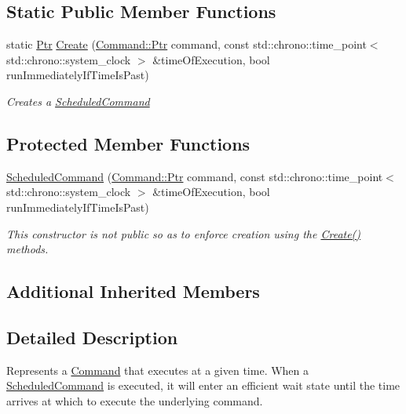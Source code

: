 \subsection*{Static Public Member Functions}
\begin{DoxyCompactItemize}
\item 
static \mbox{\hyperlink{class_command_lib_1_1_command_a3b3e4f00144373299df5c6bb1acc319d}{Ptr}} \mbox{\hyperlink{class_command_lib_1_1_scheduled_command_abf6008570965c8931d9c1bd8cd4f7b6a}{Create}} (\mbox{\hyperlink{class_command_lib_1_1_command_a3b3e4f00144373299df5c6bb1acc319d}{Command\+::\+Ptr}} command, const std\+::chrono\+::time\+\_\+point$<$ std\+::chrono\+::system\+\_\+clock $>$ \&time\+Of\+Execution, bool run\+Immediately\+If\+Time\+Is\+Past)
\begin{DoxyCompactList}\small\item\em Creates a \mbox{\hyperlink{class_command_lib_1_1_scheduled_command}{Scheduled\+Command}} \end{DoxyCompactList}\end{DoxyCompactItemize}
\subsection*{Protected Member Functions}
\begin{DoxyCompactItemize}
\item 
\mbox{\hyperlink{class_command_lib_1_1_scheduled_command_a4f22a429c29a9e28f547f1f9f2578f93}{Scheduled\+Command}} (\mbox{\hyperlink{class_command_lib_1_1_command_a3b3e4f00144373299df5c6bb1acc319d}{Command\+::\+Ptr}} command, const std\+::chrono\+::time\+\_\+point$<$ std\+::chrono\+::system\+\_\+clock $>$ \&time\+Of\+Execution, bool run\+Immediately\+If\+Time\+Is\+Past)
\begin{DoxyCompactList}\small\item\em This constructor is not public so as to enforce creation using the \mbox{\hyperlink{class_command_lib_1_1_scheduled_command_abf6008570965c8931d9c1bd8cd4f7b6a}{Create()}} methods. \end{DoxyCompactList}\end{DoxyCompactItemize}
\subsection*{Additional Inherited Members}


\subsection{Detailed Description}
Represents a \mbox{\hyperlink{class_command_lib_1_1_command}{Command}} that executes at a given time. When a \mbox{\hyperlink{class_command_lib_1_1_scheduled_command}{Scheduled\+Command}} is executed, it will enter an efficient wait state until the time arrives at which to execute the underlying command. 



